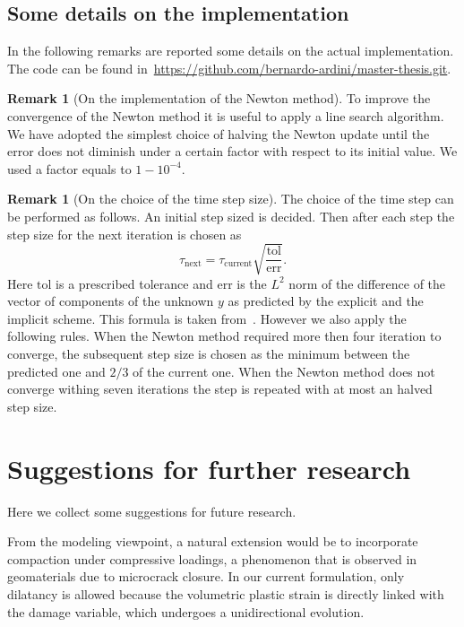 \documentclass[a4paper,10pt,twoside]{amsbook}
\numberwithin{section}{chapter}
\numberwithin{equation}{chapter}
\theoremstyle{definition}
\newtheorem{rmk}[prop]{Remark}
\begin{document}
\subsection{Some details on the implementation}

In the following remarks are reported some details on the actual implementation. The code can be found in~\url{https://github.com/bernardo-ardini/master-thesis.git}.

\begin{rmk}[On the implementation of the Newton method]
To improve the convergence of the Newton method it is useful to apply a line search algorithm. We have adopted the simplest choice of halving the Newton update until the error does not diminish under a certain factor with respect to its initial value. We used a factor equals to $1-10^{-4}$.
\end{rmk}
\begin{rmk}[On the choice of the time step size]
The choice of the time step can be performed as follows. An initial step sized is decided. Then after each step the step size for the next iteration is chosen as
\[
\tau_\text{next}=\tau_\text{current}\sqrt{\frac{\text{tol}}{\text{err}}}.
\]
Here $\text{tol}$ is a prescribed tolerance and $\text{err}$ is the $L^2$ norm of the difference of the vector of components of the unknown $y$ as predicted by the explicit and the implicit scheme. This formula is taken from~\cite{hairer1993solving}. However we also apply the following rules. When the Newton method required more then four iteration to converge, the subsequent step size is chosen as the minimum between the predicted one and $2/3$ of the current one. When the Newton method does not converge withing seven iterations the step is repeated with at most an halved step size. 
\end{rmk}

\section{Suggestions for further research}

Here we collect some suggestions for future research.

From the modeling viewpoint, a natural extension would be to incorporate compaction under compressive loadings, a phenomenon that is observed in geomaterials due to microcrack closure. In our current formulation, only dilatancy is allowed because the volumetric plastic strain is directly linked with the damage variable, which undergoes a unidirectional evolution.
\end{document}
